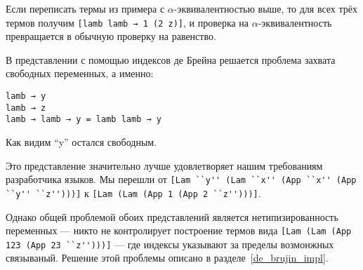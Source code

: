 Если переписать термы из примера с $\alpha$-эквивалентностью выше, то для всех трёх термов получим \lstinline{[lamb lamb → 1 (2 z)]}, и проверка на $\alpha$-эквивалентность превращается в обычную проверку на равенство.

В представлении с помощью индексов де Брейна решается проблема захвата свободных переменных, а именно:
\begin{lstlisting}
lamb → y
lamb → z
lamb → lamb → y = lamb lamb → y
\end{lstlisting}

Как видим ``y'' остался свободным.

Это представление значительно лучше удовлетворяет нашим требованиям разработчика языков. Мы перешли от
\lstinline{[Lam ``y'' (Lam ``x'' (App ``x'' (App ``y'' ``z'')))]} к \lstinline{[Lam (Lam (App 1 (App 2 ``z'')))]}.

Однако общей проблемой обоих представлений является нетипизированность переменных --- никто не контролирует построение термов вида \lstinline{[Lam (Lam (App 123 (App 23 ``z'')))]} --- где индексы указывают за пределы возмонжных связываный. Решение этой проблемы описано в разделе~\ref{de_brujin_impl}.
